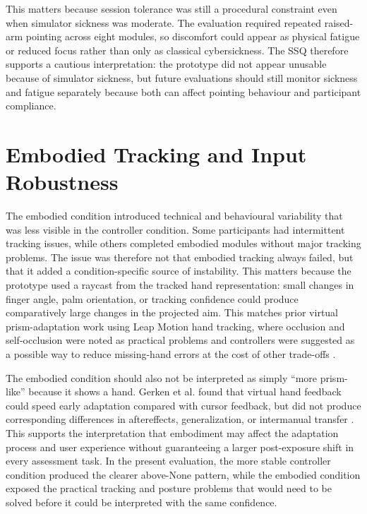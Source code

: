 This matters because session tolerance was still a procedural constraint even when simulator sickness was moderate. The evaluation required repeated raised-arm pointing across eight modules, so discomfort could appear as physical fatigue or reduced focus rather than only as classical cybersickness. The SSQ therefore supports a cautious interpretation: the prototype did not appear unusable because of simulator sickness, but future evaluations should still monitor sickness and fatigue separately because both can affect pointing behaviour and participant compliance.

\section{Embodied Tracking and Input Robustness}
\label{sec:discussion-embodied-tracking}

The embodied condition introduced technical and behavioural variability that was less visible in the controller condition. Some participants had intermittent tracking issues, while others completed embodied modules without major tracking problems. The issue was therefore not that embodied tracking always failed, but that it added a condition-specific source of instability. This matters because the prototype used a raycast from the tracked hand representation: small changes in finger angle, palm orientation, or tracking confidence could produce comparatively large changes in the projected aim. This matches prior virtual prism-adaptation work using Leap Motion hand tracking, where occlusion and self-occlusion were noted as practical problems and controllers were suggested as a possible way to reduce missing-hand errors at the cost of other trade-offs \cite{cho2022feasibility}.

The embodied condition should also not be interpreted as simply ``more prism-like'' because it shows a hand. Gerken et al. found that virtual hand feedback could speed early adaptation compared with cursor feedback, but did not produce corresponding differences in aftereffects, generalization, or intermanual transfer \cite{gerken2025sense}. This supports the interpretation that embodiment may affect the adaptation process and user experience without guaranteeing a larger post-exposure shift in every assessment task. In the present evaluation, the more stable controller condition produced the clearer above-None pattern, while the embodied condition exposed the practical tracking and posture problems that would need to be solved before it could be interpreted with the same confidence.

